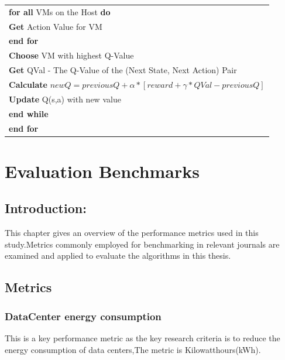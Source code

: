 \documentclass[a4paper,12pt]{Classes/RoboticsLaTeX}
\begin{document}
\begin{center}
\begin{tabular}{|l|}
    \hspace{2em} \textbf{for all} VMs on the Host \textbf{do} \\
    \hspace{3em} \textbf{Get} Action Value for VM \\
    \hspace{2em} \textbf{end for} \\
    \hspace{2em} \textbf{Choose} VM with highest Q-Value \\
    \hspace{2em} \textbf{Get} QVal - The Q-Value of the (Next State, Next Action) Pair \\
    \hspace{2em} \textbf{Calculate} $newQ = previousQ + \alpha * [reward + \gamma * QVal - previousQ]$ \\
    \hspace{2em} \textbf{Update} Q(s,a) with new value \\
    \hspace{1em} \textbf{end while} \\
    \textbf{end for} \\
    \hline
    \end{tabular}
    \end{center}


   \chapter{Evaluation Benchmarks }
   \label{chap:Evaluation Benchmarks}

    \section{Introduction:}
    This chapter gives an overview of the performance metrics used in this study.Metrics commonly employed for benchmarking in relevant journals are examined and applied to evaluate the algorithms in this thesis.

    
   \section{Metrics}
   \subsection{DataCenter energy consumption}
    This is a key performance metric as the key research criteria is to reduce the energy consumption of data centers,The metric is Kilowatthours(kWh). 
\end{document}
